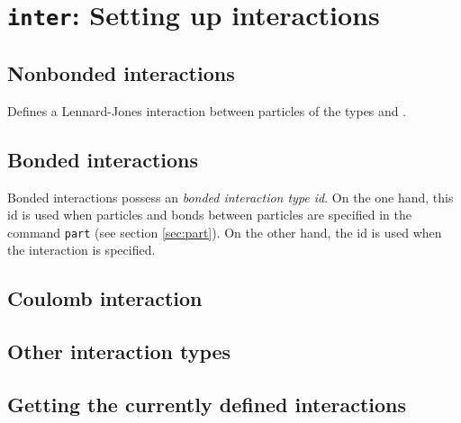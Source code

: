 \section{\texttt{inter}: Setting up interactions}
\label{sec:inter}

\subsection{Nonbonded interactions}
\label{sec:inter_nb}


Defines a Lennard-Jones interaction between particles of the types
 and .
\bigskip

\subsection{Bonded interactions}
\label{sec:inter_bonded}

  Bonded
interactions possess an \emph{bonded interaction type id}. On the one
hand, this id is used when particles and bonds between particles are
specified in the command \texttt{part} (see section \vref{sec:part}).
On the other hand, the id is used when the interaction is specified.

\subsection{Coulomb interaction}
\label{sec:inter_electrostatics}

\subsection{Other interaction types}
\label{sec:inter_other}

\subsection{Getting the currently defined interactions}


